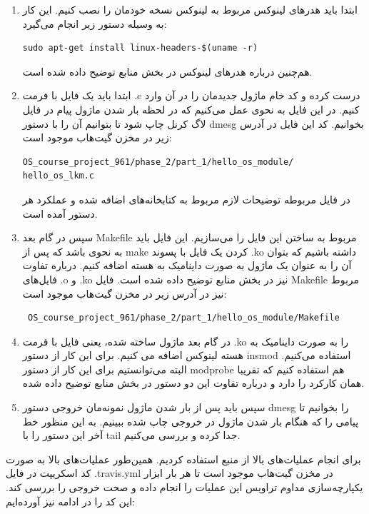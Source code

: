 \documentclass{article}
\begin{document}
\begin{enumerate}

\item ابتدا باید هدر‌های لینوکس مربوط به لینوکس نسخه خودمان را نصب کنیم. این کار به وسیله دستور زیر انجام می‌گیرد:
\begin{latin}
\begin{verbatim}
sudo apt-get install linux-headers-$(uname -r)
\end{verbatim}
\end{latin}
هم‌چنین درباره هدر‌های لینوکس در بخش منابع \cite{4} توضیح داده شده است.

\item ابتدا باید یک فایل با فرمت .c درست کرده و کد خام ماژول جدیدمان را در آن وارد کنیم. در این فایل به نحوی عمل می‌کنیم که در لحظه بار شدن ماژول پیام  در فایل لاگ کرنل چاپ شود تا بتوانیم آن را با دستور dmesg بخوانیم. کد این فایل در آدرس زیر در مخزن گیت‌هاب موجود است:
\begin{latin}
\begin{verbatim}
OS_course_project_961/phase_2/part_1/hello_os_module/
hello_os_lkm.c
\end{verbatim}
\end{latin}
در فایل مربوطه توضیحات لازم مربوط به کتابخانه‌های اضافه شده و عملکرد هر دستور آمده است.

\item سپس در گام بعد
 Makefile
 مربوط به ساختن این فایل را می‌سازیم. این فایل باید به نحوی باشد که پس از make کردن یک فایل با پسوند .ko داشته باشیم که بتوان آن را به عنوان یک ماژول به صورت داینامیک به هسته اضافه کنیم. درباره   تفاوت فایل‌های .o و .ko نیز در بخش منابع \cite{2} توضیح داده شده است. فایل Makefile مربوط نیز در آدرس زیر در مخزن گیت‌هاب موجود است:
\begin{latin}
\begin{verbatim}
 OS_course_project_961/phase_2/part_1/hello_os_module/Makefile
\end{verbatim}
\end{latin}

\item در گام بعد ماژول ساخته شده، یعنی فایل با فرمت .ko را به صورت داینامیک به هسته لینوکس اضافه می کنیم. برای این کار از دستور insmod استفاده می‌کنیم. البته می‌توانستیم برای این کار از دستور modprobe هم استفاده کنیم که تقریبا همان کارکرد را دارد و درباره تفاوت این دو دستور در بخش منابع \cite{3} توضیح داده شده.

\item سپس باید پس از بار شدن ماژول نمونه‌مان خروجی دستور dmesg را بخوانیم تا پیامی را که هنگام بار شدن ماژول در خروجی چاپ شده ببینیم. به این منظور خط آخر این دستور را با tail جدا کرده و بررسی می‌کنیم.

\end{enumerate}
برای انجام عملیا‌ت‌های بالا از منبع \cite{1} استفاده کردیم. همین‌طور عملیات‌های بالا به صورت کد اسکریپت در فایل .travis.yml در مخزن گیت‌هاب موجود است تا هر بار ابزار یکپارچه‌سازی مداوم تراویس این عملیات را انجام داده و صحت خروجی را بررسی کند. این کد را در ادامه نیز آورده‌ایم:
\end{document}
